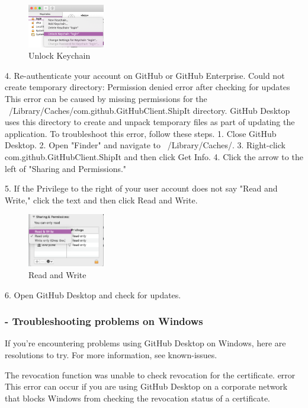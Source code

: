 \begin{figure}[ht]
    \centering
    \includegraphics[width=0.3\textwidth]{figures/Unlock Keychain.png}
    \caption{Unlock Keychain}
\end{figure}
 
 
4.	Re-authenticate your account on GitHub or GitHub Enterprise.
Could not create temporary directory: Permission denied error after checking for updates
This error can be caused by missing permissions for the ~/Library/Caches/com.github.GitHubClient.ShipIt directory. GitHub Desktop uses this directory to create and unpack temporary files as part of updating the application.
To troubleshoot this error, follow these steps.
1.	Close GitHub Desktop.
2.	Open "Finder" and navigate to ~/Library/Caches/.
3.	Right-click com.github.GitHubClient.ShipIt and then click Get Info.
4.	Click the arrow to the left of "Sharing and Permissions."

5.	If the Privilege to the right of your user account does not say "Read and Write," click the text and then click Read and Write.
\begin{figure}[ht]
    \centering
    \includegraphics[width=0.3\textwidth]{figures/Read & Write.png}
    \caption{Read and Write}
\end{figure}

6.	Open GitHub Desktop and check for updates.

\subsubsection{- Troubleshooting problems on Windows}

If you're encountering problems using GitHub Desktop on Windows, here are resolutions to try. For more information, see known-issues.

The revocation function was unable to check revocation for the certificate. error
This error can occur if you are using GitHub Desktop on a corporate network that blocks Windows from checking the revocation status of a certificate.

